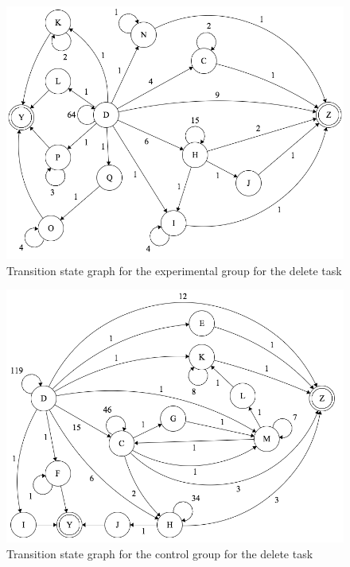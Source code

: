 \documentclass[11pt,letterpaper]{article}
\begin{document}
\begin{figure}
\centering
\includegraphics[scale=0.5]{figures/exp-transitions.png}
\caption{Transition state graph for the experimental group for the delete task}
\label{fig:trans-exp}
\end{figure}

\begin{figure}
\centering
\includegraphics[scale=0.5]{figures/control-transitions.png}
\caption{Transition state graph for the control group for the delete task}
\label{fig:trans-control}
\end{figure}
\end{document}
